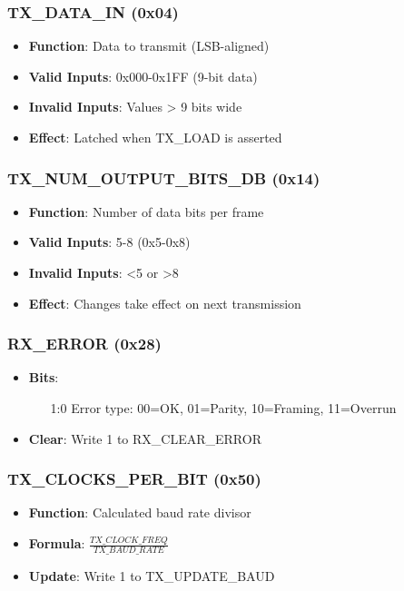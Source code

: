 \subsubsection{TX\_DATA\_IN (0x04)}
\begin{itemize}
\item \textbf{Function}: Data to transmit (LSB-aligned)
\item \textbf{Valid Inputs}: 0x000-0x1FF (9-bit data)
\item \textbf{Invalid Inputs}: Values > 9 bits wide
\item \textbf{Effect}: Latched when TX\_LOAD is asserted
\end{itemize}

\subsubsection{TX\_NUM\_OUTPUT\_BITS\_DB (0x14)}
\begin{itemize}
\item \textbf{Function}: Number of data bits per frame
\item \textbf{Valid Inputs}: 5-8 (0x5-0x8)
\item \textbf{Invalid Inputs}: <5 or >8 
\item \textbf{Effect}: Changes take effect on next transmission
\end{itemize}

\subsubsection{RX\_ERROR (0x28)}
\begin{itemize}
\item \textbf{Bits}:
  \begin{itemize}
  \item [1:0] Error type: 00=OK, 01=Parity, 10=Framing, 11=Overrun
  \end{itemize}
\item \textbf{Clear}: Write 1 to RX\_CLEAR\_ERROR
\end{itemize}

\subsubsection{TX\_CLOCKS\_PER\_BIT (0x50)}
\begin{itemize}
\item \textbf{Function}: Calculated baud rate divisor
\item \textbf{Formula}: $\frac{TX\_CLOCK\_FREQ}{TX\_BAUD\_RATE}$
\item \textbf{Update}: Write 1 to TX\_UPDATE\_BAUD
\end{itemize}

